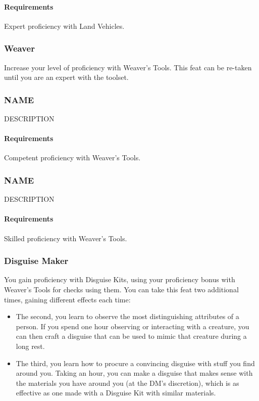     \paragraph{Requirements} Expert proficiency with Land Vehicles.
\subsubsection{Weaver} \label{feat::weaver}
    Increase your level of proficiency with Weaver's Tools.
    This feat can be re-taken until you are an expert with the toolset.
\subsubsection{NAME} \label{feat::name}
    DESCRIPTION
    \paragraph{Requirements} Competent proficiency with Weaver's Tools.
\subsubsection{NAME} \label{feat::name}
    DESCRIPTION
    \paragraph{Requirements} Skilled proficiency with Weaver's Tools.
\subsubsection{Disguise Maker} \label{feat::disguisemaker}
    You gain proficiency with Disguise Kits, using your proficiency bonus with Weaver's Tools for checks using them.
    You can take this feat two additional times, gaining different effects each time:
    \begin{itemize}
        \item The second, you learn to observe the most distinguishing attributes of a person.
        If you spend one hour observing or interacting with a creature, you can then craft a disguise that can be used to mimic that creature during a long rest.
        \item The third, you learn how to procure a convincing disguise with stuff you find around you.
        Taking an hour, you can make a disguise that makes sense with the materials you have around you (at the DM's discretion), which is as effective as one made with a Disguise Kit with similar materials.
    \end{itemize}
